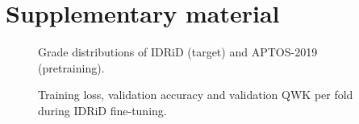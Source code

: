 \section*{Supplementary material}\label{sec:supp}
\renewcommand{\thefigure}{S\arabic{figure}}\setcounter{figure}{0}
\begin{figure}[!h]
\centering
{}
\caption{Grade distributions of IDRiD (target) and APTOS-2019 (pretraining).}
\label{fig:dist}
\end{figure}

\begin{figure}[!h]
\centering
{}
\caption{Training loss, validation accuracy and validation QWK per fold during IDRiD fine-tuning.}
\label{fig:curves}
\end{figure}
